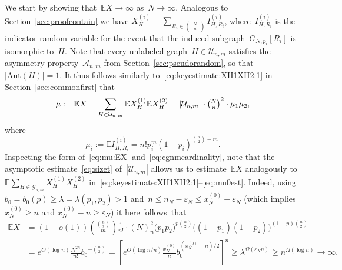 \documentclass{article}
\newcommand{\eps}{\varepsilon}
\newcommand{\E}{\mathbb{E}}
\newcommand{\cA}{\mathcal{A}}
\newcommand{\T}{\mathcal{U}_{n,m}}
\newcommand{\Xonetwo}{X^{(i)}}
\newcommand{\Xone}{X^{(1)}}
\newcommand{\Xtwo}{X^{(2)}}
\newcommand{\ionetwo}{I^{(i)}}
\newcommand{\nN}{n_N}
\newcommand{\Aut}{\mathrm{Aut}}
\newcommand\bigpar[1]{\bigl(#1\bigr)}
\newcommand\lrsqpar[1]{\left[#1\right]}
\newcommand{\refS}[1]{Section~\ref{#1}}
\begin{document}
We start by showing that~$\E X \to \infty$ as~$N \to \infty$.  
Analogous to Section~\ref{sec:proofcontain} we have ${\Xonetwo_H=\sum_{R_i\in \binom{[N]}{n}} \ionetwo_{H,R_i}}$, 
where~$\ionetwo_{H,R_i}$ is the indicator random variable for the event that the induced subgraph~$G_{N,p_i}[R_i]$ is isomorphic to~$H$.
Note that every unlabeled graph~$H \in \T$ satisfies the asymmetry property~$\cA_{n,m}$ from \refS{sec:pseudorandom}, so that~$|\Aut(H)|=1$.
It thus follows similarly to~\eqref{eq:keyestimate:XH1XH2:1} in Section~\ref{sec:commonfirst} that 
\begin{equation}\label{eq:mu:EX}
\mu :=\E X = \sum_{H\in \T} \E\Xone_H \E\Xtwo_H = |\T| \cdot \tbinom{N}{n}^2 \cdot  \mu_1\mu_2 ,
\end{equation}
where
\begin{equation}\label{eq:mu12}
\mu_i := \E \ionetwo_{H,R_i}=n!p_i^m(1-p_i)^{\binom{n}{2}-m}.
\end{equation}
Inspecting the form of~\eqref{eq:mu:EX} and~\eqref{eq:cgnmcardinality}, 
note that the asymptotic estimate~\eqref{eq:sizet} of~$|\T|$ allows us to estimate~$\E X$ analogously to~$\E\sum_{H \in \mathcal{G}_{n,m}}\Xone_H\Xtwo_H$ in~\eqref{eq:keyestimate:XH1XH2:1}--\eqref{eq:mu0est}. 
Indeed, using~${b_0=b_0(p) \ge \lambda=\lambda(p_1,p_2) > 1}$ and~${n \le \nN-\eps_N \le x_N^{(0)} - \eps_N}$ (which implies~$x_N^{(0)} \ge n$ and $x_N^{(0)}-n \geq \eps_N$) it here follows~that
\begin{equation}\label{eq:mu:EX:asymp}
\begin{split}
\E X &=  (1+o(1)) \binom{\binom{n}{2}}{m}\frac{1}{n!} \cdot (N)_n^2  \bigpar{p_1p_2}^{p\binom{n}{2}} \bigpar{(1-p_1)(1-p_2)}^{(1-p)\binom{n}{2}}\\
    & = e^{O(\log n)} \frac{N^{2n}}{n!} {b_0}^{-\binom{n}{2}} =
\lrsqpar{e^{O(\log n/n)}\tfrac{x^{(0)}_N}{n} b_0^{(x^{(0)}_N-n)/2}}^n  \geq {\lambda}^{\Omega(\eps_N n)} \geq n^{\Omega(\log n)}  \to \infty . \end{split}
\end{equation}
\end{document}
